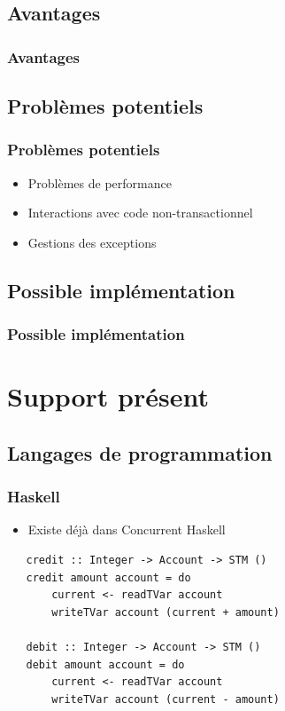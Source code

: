 \documentclass{beamer}
\begin{document}
\subsection{Avantages}
\begin{frame}
\frametitle{Avantages}

\end{frame}

\subsection{Problèmes potentiels}
\begin{frame}
\frametitle{Problèmes potentiels}
\begin{itemize}
\item Problèmes de performance
\item<2-> Interactions avec code non-transactionnel
\item<3-> Gestions des exceptions
\end{itemize}
\end{frame}

\subsection{Possible implémentation}
\begin{frame}
\frametitle{Possible implémentation}

\end{frame}

\section{Support présent}
\subsection{Langages de programmation}
\begin{frame}[fragile]
\frametitle{Haskell}
\begin{itemize}
\item Existe déjà dans Concurrent Haskell
\end{itemize}
\begin{lstlisting}
   credit :: Integer -> Account -> STM ()
   credit amount account = do
       current <- readTVar account
       writeTVar account (current + amount)
 
   debit :: Integer -> Account -> STM ()
   debit amount account = do
       current <- readTVar account
       writeTVar account (current - amount)
\end{lstlisting}
\end{frame}
\end{document}
